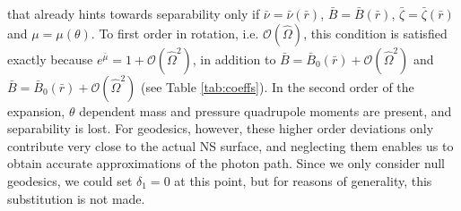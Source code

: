\documentclass[iop, usenatbib]{emulateapj}
\newcommand{\red}[1]{\textcolor{red}{#1}}
\newcommand{\pd}{\ensuremath{\partial}} %
\newcommand{\rb}{\ensuremath{\bar{r}}}
\newcommand{\wb}{\ensuremath{\bar{\omega}}}
\newcommand{\Ob}{\ensuremath{\hat{\Omega}}}
\newcommand{\nub}{\ensuremath{\bar{\nu}}}
\newcommand{\zetab}{\ensuremath{\bar{\zeta}}}
\newcommand{\Bb}{\ensuremath{\bar{B}}}
\newcommand{\mub}{\ensuremath{\bar{\mu}}}
\begin{document}
that already hints towards separability only if $\nub = \nub(\rb)$, $\Bb = \Bb(\rb)$, $\zetab = \zetab(\rb)$ and $\mu = \mu(\theta)$.
To first order in rotation, i.e. $\mathcal{O}(\Ob)$, this condition is
satisfied exactly because $e^{\mub} = 1 + \mathcal{O}(\Ob^2)$, in
addition to $\Bb = \Bb_0(\rb) + \mathcal{O}(\Ob^2)$ and $\Bb =
\Bb_0(\rb) + \mathcal{O}(\Ob^2)$ (see Table \ref{tab:coeffs}).  In the
second order of the expansion, $\theta$ dependent mass and pressure
quadrupole moments are present, and separability is lost.
For geodesics, however, these higher order deviations only
contribute very close to the actual NS surface, and 
neglecting them enables us to obtain accurate approximations of the
photon path.
Since we only consider null geodesics, we could set $\delta_1 = 0$ at
this point, but for reasons of generality, this substitution is not made.
\end{document}

